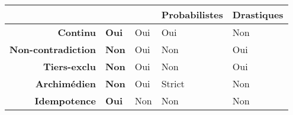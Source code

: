\begin{tabular}{r>{\small}C{.15\textwidth}>{\small}C{.15\textwidth}>{\small}C{.15\textwidth}>{\small}C{.15\textwidth}}
  \toprule
  & \bfseries {}&\bfseries {}&\bfseries
                                                   Probabilistes &\bfseries Drastiques\\
  \midrule
  \bfseries Continu & \bfseries Oui & Oui & Oui & Non \\
  \bfseries Non-contradiction & \bfseries Non & Oui & Non & Oui \\
  \bfseries Tiers-exclu & \bfseries Non & Oui & Non & Oui \\
  \bfseries Archimédien & \bfseries Non & Oui & Strict & Non \\
  \bfseries Idempotence & \bfseries Oui & Non & Non & Non \\
  \bottomrule
\end{tabular}
